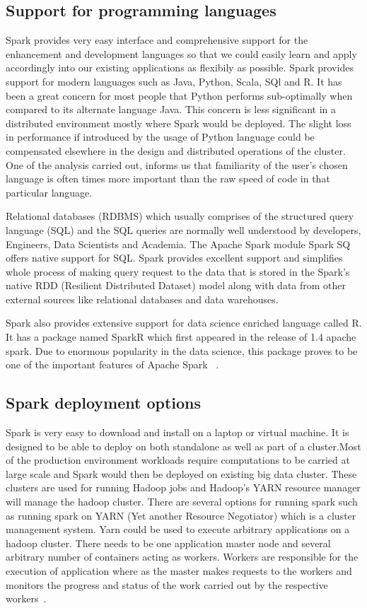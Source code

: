 \subsection{Support for programming languages}
Spark provides very easy interface and comprehensive support for the enhancement
 and development languages so that we could easily learn and apply accordingly 
 into our existing applications as flexibily as possible.
Spark provides support for modern languages such as Java, Python, Scala, SQl and
 R. It has been a great concern for most people that Python performs 
 sub-optimally when compared to its alternate language Java. This concern is 
 less significant in a distributed environment mostly where Spark would be 
 deployed. The slight loss in performance if introduced by the usage of Python 
 language could be compensated elsewhere in the design and distributed 
 operations of the cluster. One of the analysis carried out, informs us that 
 familiarity of the user's chosen language is often times more important than 
 the raw speed of code in that particular language.

Relational databases (RDBMS) which usually comprises of the structured query 
language (SQL) and the SQL queries are normally well understood by developers, 
Engineers, Data Scientists and Academia. The Apache Spark module Spark SQ 
offers native support for SQL. Spark provides excellent support and simplifies 
whole process of making query request to the data that is stored in the Spark's 
native RDD (Resilient Distributed Dataset) model along with data from other 
external sources like relational databases and data warehouses.
 
Spark also provides extensive support for data science enriched language called 
R. It has a package named SparkR which first appeared in the release of 1.4 
apache spark. Due to enormous popularity in the data science, this package 
proves to be one of the important features of Apache Spark
~\cite{hid-sp18-410-spark-architecture}.

\subsection{Spark deployment options}
Spark is very easy to download and install on a laptop or virtual machine. 
It is designed to be able to deploy on both standalone as well as part of a 
cluster.Most of the production environment workloads require computations to 
be carried at large scale and Spark would then be deployed on existing big data 
cluster. These clusters are used for running Hadoop jobs and Hadoop's YARN 
resource manager will manage the hadoop cluster. There are several options for 
running  spark such as running spark on YARN (Yet another Resource Negotiator) 
which is a cluster management system.
Yarn could be used to execute arbitrary applications on a hadoop cluster. 
There needs to be one application master node and several arbitrary number of 
containers acting as workers. Workers are responsible for the execution of 
application where as the master makes requests to the workers and monitors the 
progress and status of the work carried out by the respective workers~\cite{hid-sp18-410-spark-architecture}.

